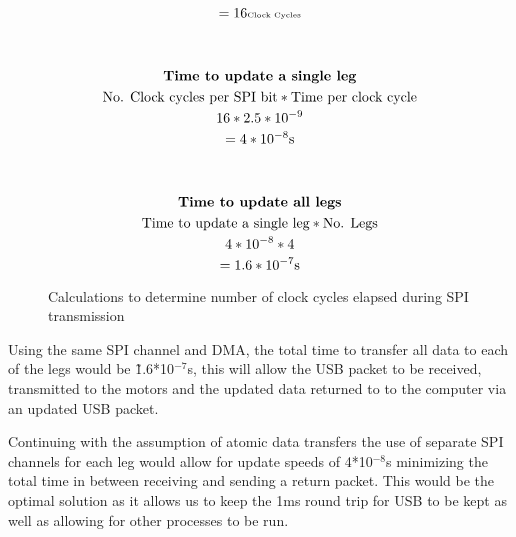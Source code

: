 \begin{figure}[!t]
\begin{minipage}{0.5\textwidth}
\begin{gather*}
                        =16\tiny{\text{Clock Cycles}}\\
                        \\
                        \\
                        \textbf{Time to update a single leg}\\
                        \text{No. Clock cycles per SPI bit} * \text{Time per clock cycle}\\
                        16 * 2.5*10^{-9}\\
                        =4*10^{-8}\text{s}\\
                        \\
                        \\
                        \textbf{Time to update all legs}\\
                        \text{Time to update a single leg} * \text{No. Legs}\\
                        4*10^{-8}* 4\\
                        =1.6*10^{-7}\text{s}\\
                    \end{gather*}  
                \end{minipage}
                \caption{Calculations to determine number of clock cycles elapsed during SPI transmission}
                \label{fig:SPIClockCycles}
                \end{figure}

                Using the same SPI channel and DMA, the total time to transfer all data to each of the legs would be \~ 1.6*10$^{-7}$s, this will allow the USB packet to be received, transmitted to the motors and the updated data returned to to the computer via an updated USB packet. \newline
            
            Continuing with the assumption of atomic data transfers the use of separate SPI channels for each leg would allow for update speeds of 4*10$^{-8}$s minimizing the total time in between receiving and sending a return packet. This would be the optimal solution as it allows us to keep the 1ms round trip for USB to be kept as well as allowing for other processes to be run.  
            
